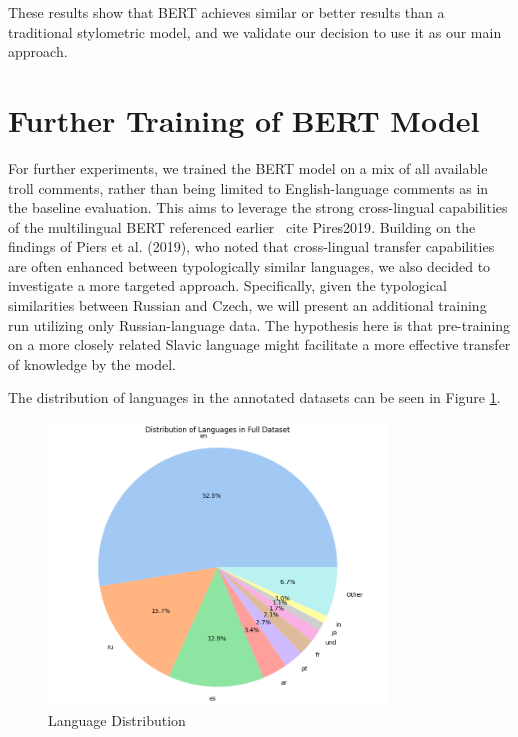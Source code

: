 \documentclass[twoside]{ctuthesis}
\theoremstyle{plain}
\theoremstyle{definition}
\theoremstyle{note}
\begin{document}
These results show that BERT achieves similar or better results than a traditional stylometric model, and we validate our decision to use it as our main approach.\par

\section{Further Training of BERT Model}

For further experiments, we trained the BERT model on a mix of all available troll comments, rather than being limited to English-language comments as in the baseline evaluation. This aims to leverage the strong cross-lingual capabilities of the multilingual BERT referenced earlier \ cite {Pires2019}. Building on the findings of Piers et al. (2019), who noted that cross-lingual transfer capabilities are often enhanced between typologically similar languages, we also decided to investigate a more targeted approach. Specifically, given the typological similarities between Russian and Czech, we will present an additional training run utilizing only Russian-language data. The hypothesis here is that pre-training on a more closely related Slavic language might facilitate a more effective transfer of knowledge by the model.\par
The distribution of languages in the annotated datasets can be seen in Figure \ref{fig:language_distribution}.\par 

\begin{figure}[h]
  \centering
  \includegraphics[width=0.8\textwidth]{figures/language_distribution.png}
  \caption{Language Distribution}
  \label{fig:language_distribution}
\end{figure}
\end{document}

